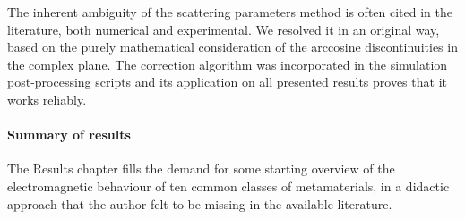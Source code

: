 The inherent ambiguity of the scattering parameters method is often cited in the literature, both numerical and experimental. We resolved it in an original way, based on the purely mathematical consideration of the arccosine discontinuities in the complex plane. The correction algorithm was incorporated in the simulation post-processing scripts and its application on all presented results proves that it works reliably. 

\paragraph{Summary of results}
The Results chapter fills the demand for some starting overview of the electromagnetic behaviour of ten common classes of metamaterials, in a didactic approach that the author felt to be missing in the available literature. %

